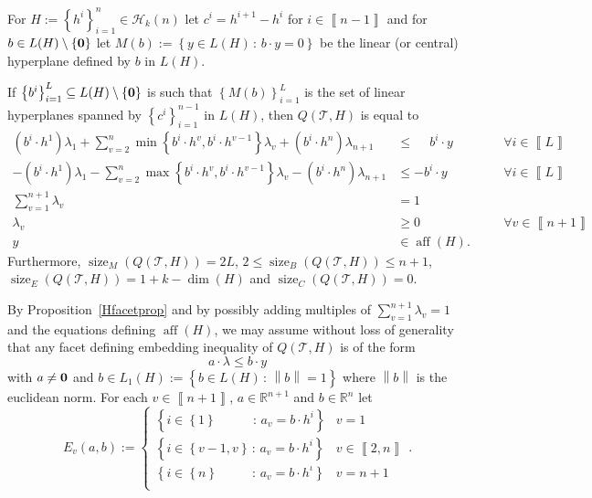 \documentclass[mnsc]{informs3}
\newcommand{\set}[1]{\left\{#1\right\}}                     %
\newcommand{\bra}[1]{\left(#1\right)}
\newcommand{\norm}[1]{\left\lVert#1\right\rVert}
\newcommand{\sidx}[1]{\left\llbracket     #1 \right\rrbracket}
\newcommand{\Real}{\mathbb R}
\DeclareMathOperator{\size}{size}
\DeclareMathOperator{\aff}{aff}
\begin{document}
\begin{proposition}\label{sos1prophyper} For $H:=\set{h^i}_{i=1}^n\in \mathcal{H}_k(n)$ let $c^i=h^{i+1}-h^i$ for $i\in \sidx{n-1}$ and for $b\in L(H)\setminus \set{\bf 0}$ let  $M(b):=\set{y\in L(H)\,:\, b\cdot y=0}$ be the linear (or central) hyperplane defined by $b$ in $L(H)$.

If  $\set{b^i}_{i=1}^L\subseteq L(H)\setminus \set{\bf 0}$ is  such that $\set{M(b)}_{i=1}^{L}$  is the set of linear hyperplanes spanned by $\set{c^i}_{i=1}^{n-1}$ in $L(H)$, then $Q\bra{\mathcal{T},H}$ is equal to  
\begin{subequations}
\begin{alignat}{3}
\bra{b^i\cdot h^1}\lambda_{1}+\sum\nolimits_{v=2}^{n} \min\set{{b^i\cdot h^v} ,{b^i\cdot h^{v-1}}}\lambda_v+\bra{b^i\cdot h^n}\lambda_{n+1}& \leq \phantom{-}b^i\cdot y &\quad&\forall i \in \sidx{L}\\
-\bra{b^i\cdot h^1}\lambda_{1}-\sum\nolimits_{v=2}^{n} \max\set{{b^i\cdot h^v} ,{b^i\cdot h^{v-1}}}\lambda_v-\bra{b^i\cdot h^n}\lambda_{n+1}& \leq {-}b^i\cdot y &\quad&\forall i \in \sidx{L}\\
\sum\nolimits_{v=1}^{n+1} \lambda_v &=1\\
\lambda_v&\geq 0 &\quad& \forall v\in \sidx{n+1}\\
y&\in \aff\bra{H}.
\end{alignat}
\end{subequations} 
Furthermore, $\size_M\bra{Q\bra{\mathcal{T},H}}=2L$,  $2\leq \size_B\bra{Q\bra{\mathcal{T},H}}\leq n+1$, $\size_E\bra{Q\bra{\mathcal{T},H}}=1+k-\dim\bra{H}$ and $\size_C\bra{Q\bra{\mathcal{T},H}}=0$.
\end{proposition}
By Proposition~\ref{Hfacetprop} and by possibly adding multiples of $\sum\nolimits_{v=1}^{n+1} \lambda_v =1$ and the equations defining $\aff\bra{H}$, we may assume without loss of generality that any facet defining embedding inequality of $Q\bra{\mathcal{T},H}$ is of the form 
\begin{equation}\label{genericforsos2}
a\cdot\lambda \leq  b\cdot y
\end{equation}
with $a\neq {\bf 0}$ and $b\in L_1(H):=\set{b\in L(H)\,:\,\norm{b}=1}$ where $\norm{b}$ is the euclidean norm.
For each $v\in \sidx{n+1}$, $a\in \Real^{n+1}$  and $b\in \Real^n$ let \[E_v\bra{a,b}:=\begin{cases}\set{ i\in \set{1}\quad\quad\;\;\,\,:\,  a_v=b\cdot h^i} & v=1\\\set{i\in \set{v-1,v}\,:\,  a_v=b\cdot h^i} & v\in \sidx{2,n}\\\set{i\in \set{n}\quad\quad\;\;\,:\, a_v=b\cdot h^\iota} & v=n+1\\\end{cases}.\]
\end{document}
